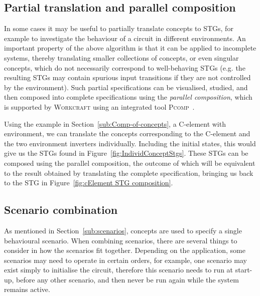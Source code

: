 \documentclass[british, journal]{IEEEtran}
\newcommand{\noun}[1]{\textsc{#1}}
\begin{document}
\vspace{-1mm}
\subsection{Partial translation and parallel composition}

In some cases it may be useful to partially translate concepts to STGs, for
example to investigate the behaviour of a circuit
in different environments. An important property of the above algorithm is
that it can be applied to incomplete systems, thereby translating
smaller collections of concepts, or even singular concepts, which do not
necessarily correspond to well-behaving STGs (e.g. the resulting STGs may contain
spurious input transitions if they are not controlled by the environment).
Such partial specifications can be visualised, studied, and then composed into
complete specifications using the \emph{parallel composition}, which is supported
by \noun{Workcraft} using an integrated tool \noun{Pcomp}~\cite{PCOMP}.

Using the example in Section~\ref{sub:Comp-of-concepts}, a C-element with environment,
we can translate the concepts corresponding to the C-element and the two
environment inverters individually. Including the initial states, this would
give us the STGs found in Figure~\ref{fig:IndividConceptStgs}. These STGs can be
composed using the parallel composition, the outcome of which will be equivalent
to the result obtained by translating the complete specification, bringing us back
to the STG in Figure~\ref{fig:cElement STG composition}.

\vspace{-1mm}
\subsection{Scenario combination\label{sub:scenario-composition}}

As mentioned in Section~\ref{sub:scenarios}, concepts are used to specify
a single behavioural scenario.
When combining scenarios, there are several things to consider in
how the scenarios fit together. Depending on the application,
some scenarios may need to operate in certain
orders, for example, one scenario may exist simply to initialise the
circuit, therefore this scenario needs to run at start-up, before
any other scenario, and then never be run again while the
system remains active.
\end{document}

